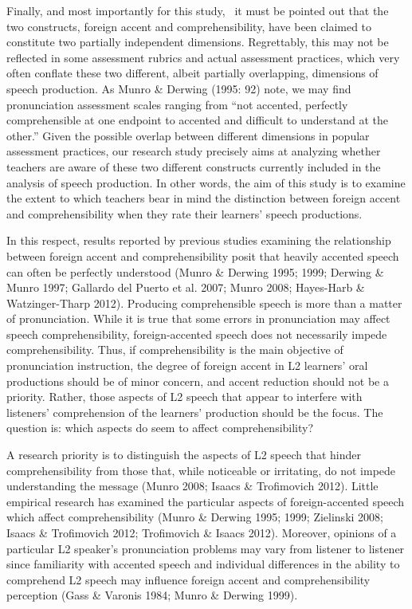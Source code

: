 \documentclass[12pt]{article}
\newenvironment{styleStandard}{\setlength\leftskip{0cm}\setlength\rightskip{0cm plus 1fil}\setlength\parindent{0cm}\setlength\parfillskip{0pt plus 1fil}\setlength\parskip{0in plus 1pt}\writerlistparindent\writerlistleftskip\leavevmode\normalfont\normalsize\writerlistlabel\ignorespaces}{\unskip\vspace{0.111in plus 0.0111in}\par}
\newcommand\writerlistleftskip{}
\newcommand\writerlistparindent{}
\newcommand\writerlistlabel{}
\begin{document}
\begin{styleStandard}
Finally, and most importantly for this study, \ it must be pointed out that the two constructs, foreign accent and comprehensibility, have been claimed to constitute two partially independent dimensions. Regrettably, this may not be reflected in some assessment rubrics and actual assessment practices, which very often conflate these two different, albeit partially overlapping, dimensions of speech production. As Munro \& Derwing (1995: 92) note, we may find pronunciation assessment scales ranging from “not accented, perfectly comprehensible at one endpoint to accented and difficult to understand at the other.” Given the possible overlap between different dimensions in popular assessment practices, our research study precisely aims at analyzing whether teachers are aware of these two different constructs currently included in the analysis of speech production. In other words, the aim of this study is to examine the extent to which teachers bear in mind the distinction between foreign accent and comprehensibility when they rate their learners’ speech productions.
\end{styleStandard}

\begin{styleStandard}
In this respect, results reported by previous studies examining the relationship between foreign accent and comprehensibility posit that heavily accented speech can often be perfectly understood (Munro \& Derwing 1995; 1999; Derwing \& Munro 1997; Gallardo del Puerto et al. 2007; Munro 2008; Hayes-Harb \& Watzinger-Tharp 2012). Producing comprehensible speech is more than a matter of pronunciation. While it is true that some errors in pronunciation may affect speech comprehensibility, foreign-accented speech does not necessarily impede comprehensibility. Thus, if comprehensibility is the main objective of pronunciation instruction, the degree of foreign accent in L2 learners’ oral productions should be of minor concern, and accent reduction should not be a priority. Rather, those aspects of L2 speech that appear to interfere with listeners’ comprehension of the learners’ production should be the focus. The question is: which aspects do seem to affect comprehensibility? 
\end{styleStandard}

\begin{styleStandard}
A research priority is to distinguish the aspects of L2 speech that hinder comprehensibility from those that, while noticeable or irritating, do not impede understanding the message (Munro 2008; Isaacs \& Trofimovich 2012). Little empirical research has examined the particular aspects of foreign-accented speech which affect comprehensibility (Munro \& Derwing 1995; 1999; Zielinski 2008; Isaacs \& Trofimovich 2012; Trofimovich \& Isaacs 2012). Moreover, opinions of a particular L2 speaker’s pronunciation problems may vary from listener to listener since familiarity with accented speech and individual differences in the ability to comprehend L2 speech may influence foreign accent and comprehensibility perception (Gass \& Varonis 1984; Munro \& Derwing 1999). 
\end{styleStandard}
\end{document}

